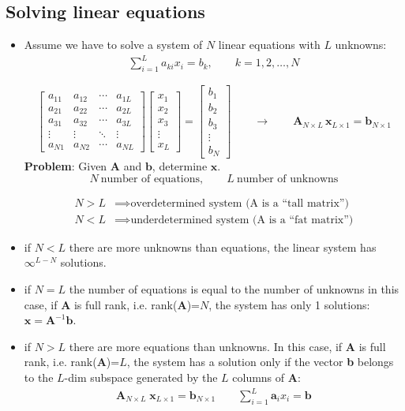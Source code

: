 \subsection{Solving linear equations}
\begin{itemize}
    \item Assume we have to solve a system of \(N\) linear equations with \(L\) unknowns:
    \begin{align*}
    \sum_{i=1}^L a_{ki} x_i = b_k, \qquad k = 1,2,\ldots,N
\end{align*}

\[
\begin{bmatrix}
a_{11} & a_{12} & \cdots & a_{1L} \\
a_{21} & a_{22} & \cdots & a_{2L} \\
a_{31} & a_{32} & \cdots & a_{3L} \\
\vdots & \vdots & \ddots & \vdots \\
a_{N1} & a_{N2} & \cdots & a_{NL}
\end{bmatrix}
\begin{bmatrix}
x_1 \\
x_2 \\
x_3 \\
\vdots \\
x_L
\end{bmatrix}
=
\begin{bmatrix}
b_1 \\
b_2 \\
b_3 \\
\vdots \\
b_N
\end{bmatrix}
\qquad
\rightarrow
\qquad
\mathbf{A}_{N \times L} \, \mathbf{x}_{L \times 1} = \mathbf{b}_{N \times 1}
\]
\textbf{Problem}: Given $\mathbf{A}$ and $\mathbf{b}$, determine $\mathbf{x}$.
\[
N~\text{number of equations}, \qquad L~\text{number of unknowns}
\]

\begin{align*}
N > L &\implies \text{overdetermined system (A is a ``tall matrix'')} \\
N < L &\implies \text{underdetermined system (A is a ``fat matrix'')}
\end{align*}
    \item if \(N<L\) there are more unknowns than equations, the linear system has \(\infty^{L-N}\) solutions.
    \item  if \(N=L\) the number of equations is equal to the number of unknowns in this case, if \textbf{A} is full rank, i.e. rank(\textbf{A})=\(N\), the system has only 1 solutions: \(\mathbf{x}=\mathbf{A}^{-1}\mathbf{b}\).
    \item if \(N>L\) there are more equations than unknowns. In this case, if \textbf{A} is full rank, i.e. rank(\textbf{A})=\(L\), the system has a solution only if the vector \textbf{b} belongs to the \(L\)-dim subspace generated by the \(L\) columns of \textbf{A}:
    \begin{align*}
\mathbf{A}_{N\times L} \; \mathbf{x}_{L\times 1} = \mathbf{b}_{N \times 1}
\qquad
\sum_{i=1}^L \mathbf{a}_i x_i = \mathbf{b}
\end{align*}


\end{itemize}
